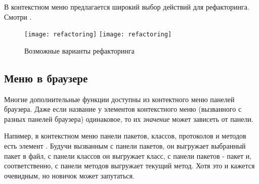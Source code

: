 \documentclass[a4paper,10pt,twoside]{book}
\begin{document}
В контекстном меню предлагается широкий выбор действий для рефакторинга. Смотри .

\begin{figure}[btp]
	\begin{center}
	\ifluluelse
		{\texttt{[image: refactoring]}}
		{\texttt{[image: refactoring]}}
	\end{center}
	\caption{Возможные варианты рефакторинга}
\end{figure}

\subsection{Меню в браузере}


Многие дополнительные функции доступны из контектного меню панелей браузера. Даже если название у элементов контекстного меню (вызванного с разных панелей браузера) одинаковое, то их \emph{значение} может зависеть от панели.


Напимер, в контекстном меню панели пакетов, классов, протоколов и методов есть элемент . Будучи вызванным с панели пакетов, он выгружает выбранный пакет в файл, с панели классов он выгружает класс, с панели пакетов - пакет и, соответственно, с панели методов выгружает текущий метод. Хотя это и кажется очевидным, но новичок может запутаться. 

\end{document}

